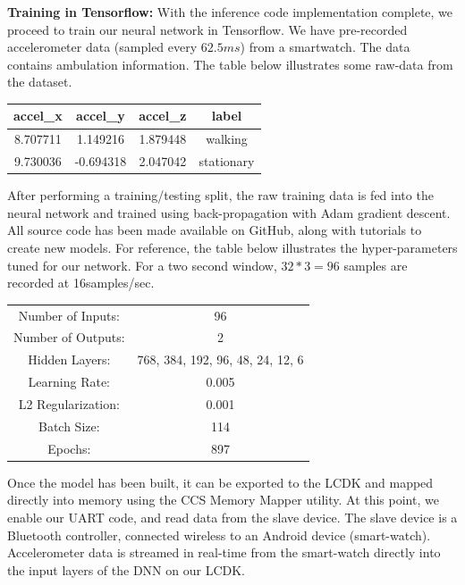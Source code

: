 \textbf{Training in Tensorflow:} With the inference code implementation complete, we proceed to train our neural network in Tensorflow. We have pre-recorded accelerometer data (sampled every $62.5ms$) from a smartwatch. The data contains ambulation information. The table below illustrates some raw-data from the dataset.
\begin{center}
 \begin{tabular}{||c c c c||} 
 \hline
 accel_x & accel_y & accel_z & label \\
 \hline\hline
 8.707711 & 1.149216 & 1.879448 & walking \\
 \hline
 9.730036 & -0.694318 & 2.047042 & stationary \\
 \hline
\end{tabular}
\end{center}

After performing a training/testing split, the raw training data is fed into the neural network and trained using back-propagation\cite{backprop} with Adam\cite{adam} gradient descent. All source code has been made available on GitHub, along with tutorials to create new models. For reference, the table below illustrates the hyper-parameters tuned for our network. For a two second window, $32*3 = 96$ samples are recorded at 16samples/sec.

\begin{center}
\begin{tabular}{ c c }

Number of Inputs:  & 96 \\ 
Number of Outputs: & 2 \\ 
Hidden Layers: & {768, 384, 192, 96, 48, 24, 12, 6} \\ 
Learning Rate: & 0.005 \\  
L2 Regularization: & 0.001 \\
Batch Size: & 114 \\
Epochs: & 897  \\
\end{tabular}
\end{center}

Once the model has been built, it can be exported to the LCDK and mapped directly into memory using the CCS Memory Mapper utility. At this point, we enable our UART code, and read data from the slave device. The slave device is a Bluetooth controller, connected wireless to an Android device (smart-watch). Accelerometer data is streamed in real-time from the smart-watch directly into the input layers of the DNN on our LCDK.